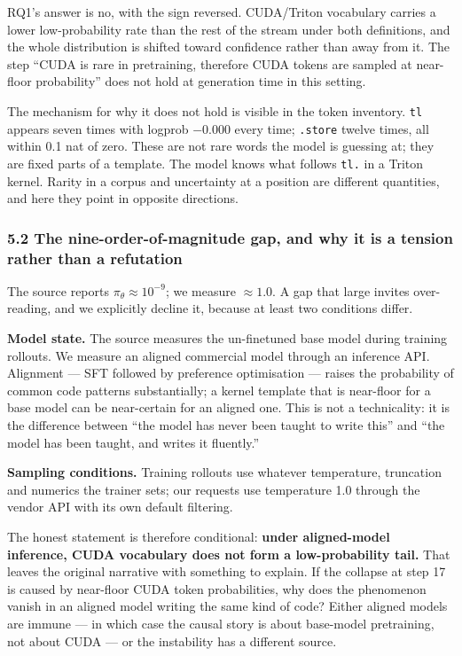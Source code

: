 \documentclass[
  11pt,
]{article}
\begin{document}
RQ1's answer is no, with the sign reversed. CUDA/Triton vocabulary
carries a lower low-probability rate than the rest of the stream under
both definitions, and the whole distribution is shifted toward
confidence rather than away from it. The step ``CUDA is rare in
pretraining, therefore CUDA tokens are sampled at near-floor
probability'' does not hold at generation time in this setting.

The mechanism for why it does not hold is visible in the token
inventory. \texttt{tl} appears seven times with logprob −0.000 every
time; \texttt{.store} twelve times, all within 0.1 nat of zero. These
are not rare words the model is guessing at; they are fixed parts of a
template. The model knows what follows \texttt{tl.} in a Triton kernel.
Rarity in a corpus and uncertainty at a position are different
quantities, and here they point in opposite directions.

\hypertarget{the-nine-order-of-magnitude-gap-and-why-it-is-a-tension-rather-than-a-refutation}{%
\subsubsection{5.2 The nine-order-of-magnitude gap, and why it is a
tension rather than a
refutation}\label{the-nine-order-of-magnitude-gap-and-why-it-is-a-tension-rather-than-a-refutation}}

The source reports \(\pi_\theta \approx 10^{-9}\); we measure
\(\approx 1.0\). A gap that large invites over-reading, and we
explicitly decline it, because at least two conditions differ.

\textbf{Model state.} The source measures the un-finetuned base model
during training rollouts. We measure an aligned commercial model through
an inference API. Alignment --- SFT followed by preference optimisation
--- raises the probability of common code patterns substantially; a
kernel template that is near-floor for a base model can be near-certain
for an aligned one. This is not a technicality: it is the difference
between ``the model has never been taught to write this'' and ``the
model has been taught, and writes it fluently.''

\textbf{Sampling conditions.} Training rollouts use whatever
temperature, truncation and numerics the trainer sets; our requests use
temperature 1.0 through the vendor API with its own default filtering.

The honest statement is therefore conditional: \textbf{under
aligned-model inference, CUDA vocabulary does not form a low-probability
tail.} That leaves the original narrative with something to explain. If
the collapse at step 17 is caused by near-floor CUDA token
probabilities, why does the phenomenon vanish in an aligned model
writing the same kind of code? Either aligned models are immune --- in
which case the causal story is about base-model pretraining, not about
CUDA --- or the instability has a different source.
\end{document}
